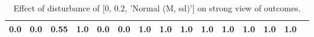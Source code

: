 \begin{table}
\begin{tabular}{l|cc|cc|cc|cc|cc|cc|cc}
\cellcolor{Bittersweet}0.0&\cellcolor{Bittersweet}0.0&0.55&1.0&\cellcolor{Bittersweet}0.0&\cellcolor{Bittersweet}0.0&\cellcolor{Bittersweet}1.0&\cellcolor{Bittersweet}1.0&\cellcolor{Bittersweet}1.0&\cellcolor{Bittersweet}1.0&\cellcolor{Bittersweet}1.0&\cellcolor{Bittersweet}1.0&\cellcolor{Bittersweet}1.0&\cellcolor{Bittersweet}1.0\\\bottomrule\end{tabular}\caption{Effect of disturbance of [0, 0.2, 'Normal (M, sd)'] on strong view of outcomes.}\end{table}